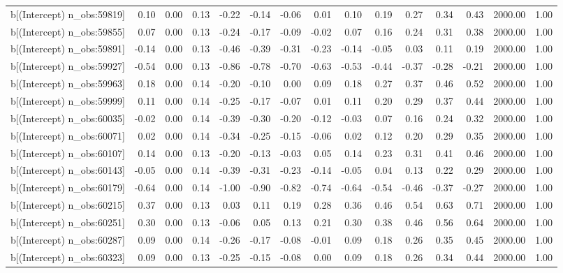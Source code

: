 \begin{table}[ht]
\begin{tabular}{rrrrrrrrrrrrrrr}
  b[(Intercept) n\_obs:59819] & 0.10 & 0.00 & 0.13 & -0.22 & -0.14 & -0.06 & 0.01 & 0.10 & 0.19 & 0.27 & 0.34 & 0.43 & 2000.00 & 1.00 \\ 
  b[(Intercept) n\_obs:59855] & 0.07 & 0.00 & 0.13 & -0.24 & -0.17 & -0.09 & -0.02 & 0.07 & 0.16 & 0.24 & 0.31 & 0.38 & 2000.00 & 1.00 \\ 
  b[(Intercept) n\_obs:59891] & -0.14 & 0.00 & 0.13 & -0.46 & -0.39 & -0.31 & -0.23 & -0.14 & -0.05 & 0.03 & 0.11 & 0.19 & 2000.00 & 1.00 \\ 
  b[(Intercept) n\_obs:59927] & -0.54 & 0.00 & 0.13 & -0.86 & -0.78 & -0.70 & -0.63 & -0.53 & -0.44 & -0.37 & -0.28 & -0.21 & 2000.00 & 1.00 \\ 
  b[(Intercept) n\_obs:59963] & 0.18 & 0.00 & 0.14 & -0.20 & -0.10 & 0.00 & 0.09 & 0.18 & 0.27 & 0.37 & 0.46 & 0.52 & 2000.00 & 1.00 \\ 
  b[(Intercept) n\_obs:59999] & 0.11 & 0.00 & 0.14 & -0.25 & -0.17 & -0.07 & 0.01 & 0.11 & 0.20 & 0.29 & 0.37 & 0.44 & 2000.00 & 1.00 \\ 
  b[(Intercept) n\_obs:60035] & -0.02 & 0.00 & 0.14 & -0.39 & -0.30 & -0.20 & -0.12 & -0.03 & 0.07 & 0.16 & 0.24 & 0.32 & 2000.00 & 1.00 \\ 
  b[(Intercept) n\_obs:60071] & 0.02 & 0.00 & 0.14 & -0.34 & -0.25 & -0.15 & -0.06 & 0.02 & 0.12 & 0.20 & 0.29 & 0.35 & 2000.00 & 1.00 \\ 
  b[(Intercept) n\_obs:60107] & 0.14 & 0.00 & 0.13 & -0.20 & -0.13 & -0.03 & 0.05 & 0.14 & 0.23 & 0.31 & 0.41 & 0.46 & 2000.00 & 1.00 \\ 
  b[(Intercept) n\_obs:60143] & -0.05 & 0.00 & 0.14 & -0.39 & -0.31 & -0.23 & -0.14 & -0.05 & 0.04 & 0.13 & 0.22 & 0.29 & 2000.00 & 1.00 \\ 
  b[(Intercept) n\_obs:60179] & -0.64 & 0.00 & 0.14 & -1.00 & -0.90 & -0.82 & -0.74 & -0.64 & -0.54 & -0.46 & -0.37 & -0.27 & 2000.00 & 1.00 \\ 
  b[(Intercept) n\_obs:60215] & 0.37 & 0.00 & 0.13 & 0.03 & 0.11 & 0.19 & 0.28 & 0.36 & 0.46 & 0.54 & 0.63 & 0.71 & 2000.00 & 1.00 \\ 
  b[(Intercept) n\_obs:60251] & 0.30 & 0.00 & 0.13 & -0.06 & 0.05 & 0.13 & 0.21 & 0.30 & 0.38 & 0.46 & 0.56 & 0.64 & 2000.00 & 1.00 \\ 
  b[(Intercept) n\_obs:60287] & 0.09 & 0.00 & 0.14 & -0.26 & -0.17 & -0.08 & -0.01 & 0.09 & 0.18 & 0.26 & 0.35 & 0.45 & 2000.00 & 1.00 \\ 
  b[(Intercept) n\_obs:60323] & 0.09 & 0.00 & 0.13 & -0.25 & -0.15 & -0.08 & 0.00 & 0.09 & 0.18 & 0.26 & 0.34 & 0.44 & 2000.00 & 1.00 \\ 

\end{tabular}
\end{table}
